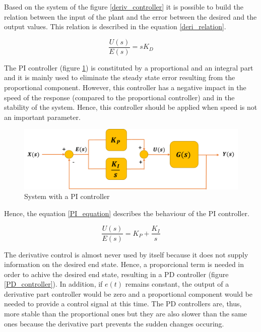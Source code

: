 Based on the system of the figure \ref{deriv_controller} it is possible to build the relation between the input of the plant and the error between the desired and the output values. This relation is described in the equation \ref{deri_relation}.

\begin{equation}\label{deri_relation}
\frac{U(s)}{E(s)}= sK_D
\end{equation}

\vspace{5mm}

The PI controller (figure \ref{PI_controller}) is constituted by a proportional and an integral part and it is mainly used to eliminate the steady state error resulting from the proportional component. However, this controller has a negative impact in the speed of the response (compared to the proportional controller) and in the stability of the system. Hence, this controller should be applied when speed is not an important parameter. %

\begin{figure}[H]
	\centering
	\includegraphics[scale=0.6]{figures/PI_controller.png}
	\caption{System with a PI controller}
	\label{PI_controller}
\end{figure}

Hence, the equation \ref{PI_equation} describes the behaviour of the PI controller.

\begin{equation}\label{PI_equation}
\frac{U(s)}{E(s)}= K_P + \frac{K_I}{s}
\end{equation}

\vspace{5mm}

The derivative control is almost never used by itself because it does not supply information on the desired end state. Hence, a proporcional term is needed in order to achive the desired end state, resulting in a PD controller (figure \ref{PD_controller}). In addition, if $e(t)$ remains constant, the output of a derivative part controller would be zero and a proportional component would be needed to provide a control signal at this time. The PD controllers are, thus, more stable than the proportional ones but they are also slower than the same ones because the derivative part prevents the sudden changes occuring.

